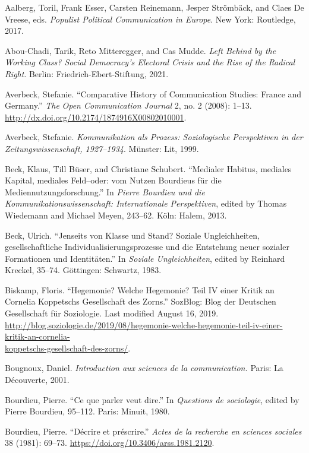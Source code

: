 \documentclass{tufte-handout}
\begin{document}
\begin{hangparas}{.25in}{1} 



Aalberg, Toril, Frank Esser, Carsten Reinemann, Jesper Strömbäck, and
Claes De Vreese, eds. \emph{Populist Political Communication in Europe}.
New York: Routledge, 2017.

Abou-Chadi, Tarik, Reto Mitteregger, and Cas Mudde. \emph{Left Behind by
the Working Class? Social Democracy's Electoral Crisis and the Rise of
the Radical Right}. Berlin: Friedrich-Ebert-Stiftung, 2021.

Averbeck, Stefanie. ``Comparative History of Communication Studies:
France and Germany.'' \emph{The} \emph{Open Communication Journal} 2,
no. 2 (2008): 1--13.
\url{http://dx.doi.org/10.2174/1874916X00802010001}.

Averbeck, Stefanie. \emph{Kommunikation als Prozess: Soziologische
Perspektiven in der Zeitungswissenschaft, 1927--1934}. Münster: Lit,
1999.

Beck, Klaus, Till Büser, and Christiane Schubert. ``Medialer Habitus,
mediales Kapital, mediales Feld--oder: vom Nutzen Bourdieus für die
Mediennutzungsforschung.'' In \emph{Pierre Bourdieu und die
Kommunikationswissenschaft: Internationale Perspektiven}, edited by
Thomas Wiedemann and Michael Meyen, 243--62. Köln: Halem, 2013.

Beck, Ulrich. ``Jenseits von Klasse und Stand? Soziale Ungleichheiten,
gesellschaftliche Individualisierungsprozesse und die Entstehung neuer
sozialer Formationen und Identitäten.'' In \emph{Soziale
Ungleichheiten}, edited by Reinhard Kreckel, 35--74. Göttingen:
Schwartz, 1983.

Biskamp, Floris. ``Hegemonie? Welche Hegemonie? Teil IV einer Kritik an
Cornelia Koppetschs Gesellschaft des Zorns.'' SozBlog: Blog der
Deutschen Gesellschaft für Soziologie. Last modified August 16, 2019.
\url{http://blog.soziologie.de/2019/08/hegemonie-welche-hegemonie-teil-iv-einer-kritik-an-cornelia-}\\\hspace{0.25in}\url{koppetschs-gesellschaft-des-zorns/}.

Bougnoux, Daniel. \emph{Introduction aux sciences de la communication.}
Paris: La Découverte, 2001.

Bourdieu, Pierre. ``Ce que parler veut dire.'' In \emph{Questions de
sociologie}, edited by Pierre Bourdieu, 95--112. Paris: Minuit, 1980.

Bourdieu, Pierre. ``Décrire et préscrire.'' \emph{Actes de la recherche
en sciences sociales} 38 (1981): 69--73.
\url{https://doi.org/10.3406/arss.1981.2120}.


\end{hangparas}
\end{document}
